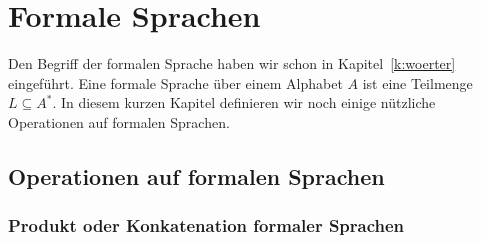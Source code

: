 \Tut\chapter{Formale Sprachen}
\label{k:sprachen}

Den Begriff der formalen Sprache haben wir schon in Kapitel~\ref{k:woerter}
eingeführt.
%
Eine formale Sprache über einem Alphabet $A$
ist eine Teilmenge $L\subseteq A^*$. 
%
In diesem kurzen Kapitel definieren wir noch einige nützliche Operationen auf
formalen Sprachen.

\Tut\section{Operationen auf formalen Sprachen}

\Tut\subsection{Produkt oder Konkatenation formaler Sprachen}
\label{subsec:produkt-sprachen}

